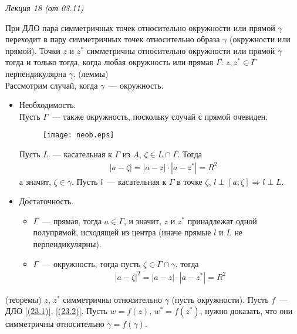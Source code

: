 \begin{flushright}
    \textit{Лекция 18 (от 03.11)}
\end{flushright}
\theorem
При ДЛО пара симметричных точек относительно окружности или прямой $\gamma$
переходит в пару симметричных точек относительно образа $\gamma$ (окружности или
прямой).
\lemma
Точки $z$ и $z^*$ симметричны относительно окружности или прямой $\gamma$ тогда
и только тогда, когда любая окружность или прямая $\Gamma$: $z, z^* \in \Gamma$
перпендикулярна $\gamma$.
\pr (леммы)
\\
Рассмотрим случай, когда $\gamma$~--- окружность. 
\begin{itemize}
    \item Необходимость.
    \\
    Пусть $\Gamma$~--- также окружность, поскольку случай с прямой очевиден.
    \begin{figure}[h!]
        \centering
        \texttt{[image: neob.eps]}
        \label{fig:23.1}
    \end{figure}
    Пусть $L$~--- касательная к $\Gamma$ из $A$, $\zeta \in L \cap \Gamma$.
    Тогда
    \begin{align*}
      & \left| a - \zeta \right| = \left| a-z \right|\cdot \left| a-z^* \right| = R^2
    \end{align*}
    а значит, $\zeta \in \gamma$. Пусть $l$~--- касательная к $\Gamma$ в точке
    $\zeta$, $l \perp [a;\zeta] \Rightarrow l \perp L$.
    \item Достаточность.
    \begin{itemize}
        \item $\Gamma$~--- прямая, тогда $a \in \Gamma$, и значит, $z$ и $z^*$
        принадлежат одной полупрямой, исходящей из центра (иначе прямые $l$ и
        $L$ не перпендикулярны).
        \item $\Gamma$~--- окружность, тогда пусть $\zeta \in \Gamma \cap
        \gamma$, тогда
        \begin{align*}
          & \left| a - \zeta \right|^2 = \left| a-z \right|\cdot \left| a-z^* \right| = R^2
        \end{align*}
    \end{itemize}
\end{itemize}
\pr (теоремы)
$z$, $z^*$ симметричны относительно $\gamma$ (пусть окружности). Пусть $f$~---
ДЛО \eqref{(23.1)}, \eqref{(23.2)}. Пусть $w = f(z)$, $w^* = f(z^*)$, нужно
доказать, что они симметричны относительно $\tilde{\gamma} = f(\gamma)$.
\\
